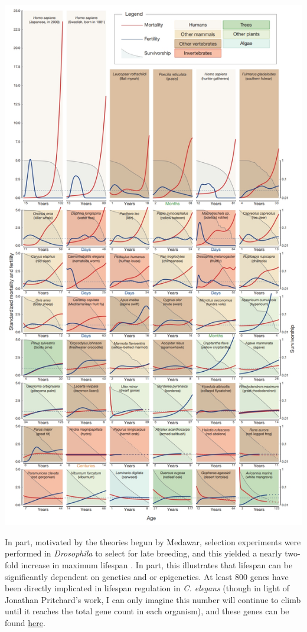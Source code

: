 \documentclass[]{book}
\begin{document}
\includegraphics{images/04-7.jpg}

In part, motivated by the theories begun by Medawar, selection
experiments were performed in \emph{Drosophila} to select for late
breeding, and this yielded a nearly two-fold increase in maximum
lifespan \citep{rose1980test}. In part, this illustrates that lifespan
can be significantly dependent on genetics and or epigenetics. At least
800 genes have been directly implicated in lifespan regulation in
\emph{C. elegans} (though in light of Jonathan Pritchard's work, I can
only imagine this number will continue to climb until it reaches the
total gene count in each organism), and these genes can be found
\href{http://genomics.senescence.info/genes/search.php?organism=Caenorhabditis+elegans\&show=4}{here}.
\end{document}
